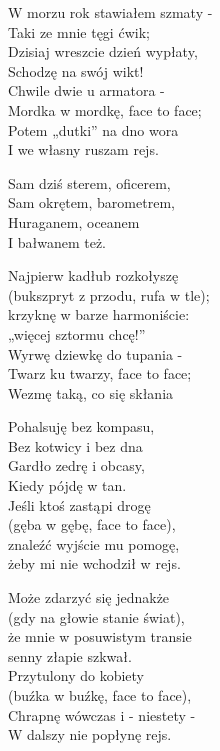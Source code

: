 \begin{textn}
    \chordfill
    W morzu rok stawiałem szmaty -\\
    Taki ze mnie tęgi ćwik;\\
    Dzisiaj wreszcie dzień wypłaty,\\
    Schodzę na swój wikt!\\
    Chwile dwie u armatora -\\
    Mordka w mordkę, face to face;\\
    Potem „dutki” na dno wora\\
    I we własny ruszam rejs.

    \vin Sam dziś sterem, oficerem,\\
    \vin Sam okrętem, barometrem,\\
    \vin Huraganem, oceanem\\
    \vin I bałwanem też.

    Najpierw kadłub rozkołyszę\\
    (bukszpryt z przodu, rufa w tle);\\
    krzyknę w barze harmoniście:\\
    „więcej sztormu chcę!”\\
    Wyrwę dziewkę do tupania -\\
    Twarz ku twarzy, face to face;\\
    Wezmę taką, co się skłania

    Pohalsuję bez kompasu,\\
    Bez kotwicy i bez dna\\
    Gardło zedrę i obcasy,\\
    Kiedy pójdę w tan.\\
    Jeśli ktoś zastąpi drogę\\
    (gęba w gębę, face to face),\\
    znaleźć wyjście mu pomogę,\\
    żeby mi nie wchodził w rejs.

    Może zdarzyć się jednakże\\
    (gdy na głowie stanie świat),\\
    że mnie w posuwistym transie\\
    senny złapie szkwał.\\
    Przytulony do kobiety\\
    (buźka w buźkę, face to face),\\
    Chrapnę wówczas i - niestety -\\
    W dalszy nie popłynę rejs.
\end{textn}
